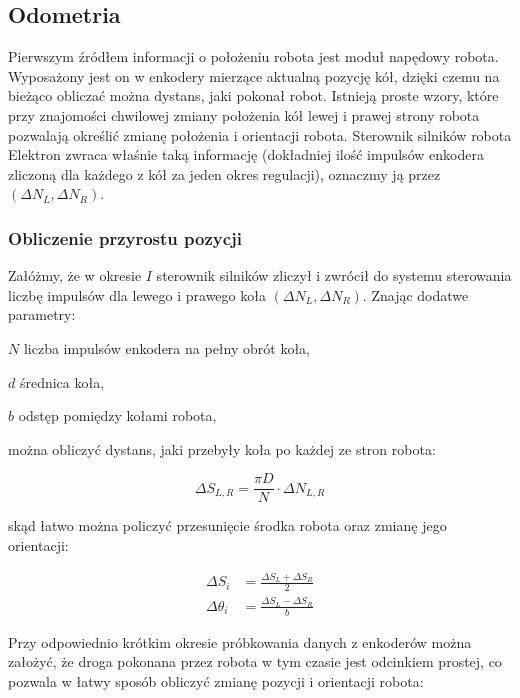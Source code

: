 \subsection{Odometria}

Pierwszym źródłem informacji o położeniu robota jest moduł napędowy robota.
Wyposażony jest on w enkodery mierzące aktualną pozycję kół, dzięki czemu na
bieżąco obliczać można dystans, jaki pokonał robot. Istnieją proste wzory, które
przy znajomości chwilowej zmiany położenia kół lewej i prawej strony robota
pozwalają określić zmianę położenia i orientacji robota. Sterownik silników
robota Elektron zwraca właśnie taką informację (dokładniej ilość impulsów
enkodera zliczoną dla każdego z kół za jeden okres regulacji), oznaczmy ją przez
$(\Delta N_L, \Delta N_R)$.

\subsubsection{Obliczenie przyrostu pozycji}

Załóżmy, że w okresie $I$ sterownik silników zliczył i zwrócił do systemu
sterowania liczbę impulsów dla lewego i prawego koła $(\Delta N_L, \Delta N_R)$.
Znając dodatwe parametry:


\begin{mydescription}{5pt}
\item[$N$] liczba impulsów enkodera na pełny obrót koła,
\item[$d$] średnica koła,
\item[$b$] odstęp pomiędzy kołami robota,
\end{mydescription}

można obliczyć dystans, jaki przebyły koła po każdej ze stron robota:

\[
\Delta S_{L,R} = \frac{\pi D}{N} \cdot \Delta N_{L,R}
\]

skąd łatwo można policzyć przesunięcie środka robota oraz zmianę jego
orientacji:

\begin{align*}
\Delta S_i &= \frac{\Delta S_L + \Delta S_R}{2} \\
\Delta \theta_i &= \frac{\Delta S_L - \Delta S_R}{b}
\end{align*}

Przy odpowiednio krótkim okresie próbkowania danych z enkoderów można założyć,
że droga pokonana przez robota w tym czasie jest odcinkiem prostej, co pozwala w
łatwy sposób obliczyć zmianę pozycji i orientacji robota:

